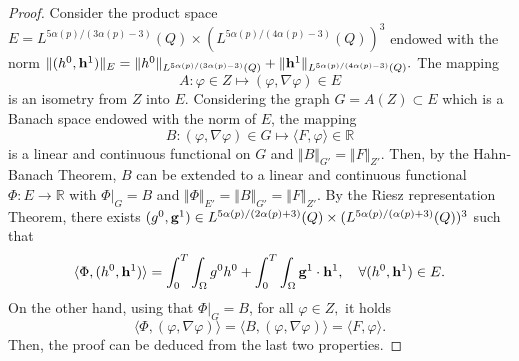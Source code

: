 \documentclass[11pt,reqno]{amsart}%
\numberwithin{equation}{section}
\begin{document}
\begin{proof}
Consider the product space $E=L^{5\alpha(p)/(3\alpha(p)-3)}(Q)\times (L^{5\alpha(p)/(4\alpha(p)-3)}(Q))^3$ endowed with the norm 
$\Vert (h^0,{\bf h}^1)\Vert_E=\Vert h^0\Vert_{L^{5\alpha(p)/(3\alpha(p)-3)}(Q)}+\Vert {\bf h}^1\Vert_{L^{5\alpha(p)/(4\alpha(p)-3)}(Q)}.$ 
The mapping $$A:\varphi\in Z\longmapsto (\varphi, \nabla\varphi)\in E$$ is an isometry from $Z$ into $E.$ Considering the graph $G=A(Z)\subset E$  which is a Banach space endowed with the norm  of $E$, the mapping 
$$B:(\varphi, \nabla\varphi)\in G\longmapsto \langle F,\varphi\rangle \in \mathbb{R}$$ is a linear and continuous functional on $G$ and $\Vert B\Vert_{G'}=\Vert F\Vert_{Z'}$. Then, by the Hahn-Banach Theorem, $B$ can be extended to a linear and continuous functional $\Phi:E\rightarrow \mathbb{R}$ with $\Phi|_{G}=B$ and $\Vert \Phi\Vert_{E'}=\Vert B\Vert_{G'}=\Vert F\Vert_{Z'}.$ By the Riesz representation Theorem, there exists $(g^0,{\bf g}^1)\in L^{5\alpha(p)/(2\alpha(p)+3)}(Q)\times (L^{5\alpha(p)/(\alpha(p)+3)}(Q))^3$ such that
$$\langle \Phi,(h^0,{\bf h}^1)\rangle=\int_0^T\int_\Omega g^0 h^0+\int_0^T\int_\Omega {\bf g}^1\cdot {\bf h}^1,\quad  \forall (h^0,{\bf h}^1)\in E.$$
On the other hand, using that $\Phi|_G=B$,  for all $\varphi\in Z,$ it holds
$$
\langle \Phi,(\varphi,\nabla\varphi)\rangle = \langle B,(\varphi,\nabla\varphi)\rangle
=\langle F,\varphi\rangle.$$
Then,  the proof can be deduced from the last two properties.
\end{proof}
\end{document}
